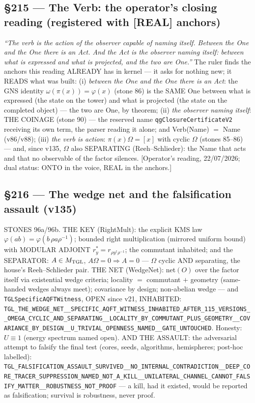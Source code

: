 \documentclass[11pt]{article}
\theoremstyle{definition}\newtheorem{deriv}{Derivation}
\begin{document}
\subsection*{\S215 --- The Verb: the operator's closing reading (registered with [REAL] anchors)}\emph{``The verb is the action of the observer capable of naming itself. Between the One and the One there is an Act. And the Act is the observer naming itself: between what is expressed and what is projected, and the two are One.''} The ruler finds the anchors this reading ALREADY has in kernel --- it asks for nothing new; it READS what was built: (i) \emph{between the One and the One there is an Act}: the GNS identity $\omega(\pi(x))=\varphi(x)$ (stone 86) is the SAME One between what is expressed (the state on the tower) and what is projected (the state on the completed object) --- the two are One, by theorem; (ii) \emph{the observer naming itself}: THE COINAGE (stone 90) --- the reserved name \texttt{qgClosureCertificateV2} receiving its own term, the parser reading it alone; and Verb(Name) $=$ Name (v86/v88); (iii) \emph{the verb is action}: $\pi(x)\Omega=[x]$ with cyclic $\Omega$ (stones 85--86) --- and, since v135, $\Omega$ also SEPARATING (Reeh--Schlieder): the Name that acts and that no observable of the factor silences. [Operator's reading, 22/07/2026; dual status: ONTO in the voice, REAL in the anchors.]

\subsection*{\S216 --- The wedge net and the falsification assault (v135)}STONES 96a/96b. THE KEY (RightMult): the explicit KMS law $\varphi(ab)=\varphi(b\,\rho a\rho^{-1})$; bounded right multiplication (mirrored uniform bound) with MODULAR ADJOINT $r_y^{*}=r_{\rho y^{\dagger}\rho^{-1}}$; the commutant inhabited; and the SEPARATOR: $A\in M_{\rm TGL}$, $A\Omega=0\Rightarrow A=0$ --- $\Omega$ cyclic AND separating, the house's Reeh--Schlieder pair. THE NET (WedgeNet): net$(O)$ over the factor itself via existential wedge criteria; locality $=$ commutant $+$ geometry (same-handed wedges always meet); covariance by design; non-abelian wedge --- and \texttt{TGLSpecificAQFTWitness}, OPEN since v21, INHABITED: \texttt{TGL\_THE\_WEDGE\_NET\_\_SPECIFIC\_AQFT\_WITNESS\_INHABITED\_AFTER\_115\_VERSIONS\_\_OMEGA\_CYCLIC\_AND\_SEPARATING\_\_LOCALITY\_BY\_COMMUTANT\_PLUS\_GEOMETRY\_\_COVARIANCE\_BY\_DESIGN\_\_U\_TRIVIAL\_OPENNESS\_NAMED\_\_GATE\_UNTOUCHED}. Honesty: $U\equiv 1$ (energy spectrum named open). AND THE ASSAULT: the adversarial attempt to falsify the final test (cores, seeds, algorithms, hemispheres; post-hoc labelled): \texttt{TGL\_FALSIFICATION\_ASSAULT\_SURVIVED\_\_NO\_INTERNAL\_CONTRADICTION\_\_DEEP\_CORE\_TRACER\_SUPPRESSION\_NAMED\_NOT\_A\_KILL\_\_UNILATERAL\_CHANNEL\_CANNOT\_FALSIFY\_MATTER\_\_ROBUSTNESS\_NOT\_PROOF} --- a kill, had it existed, would be reported as falsification; survival is robustness, never proof.
\end{document}
